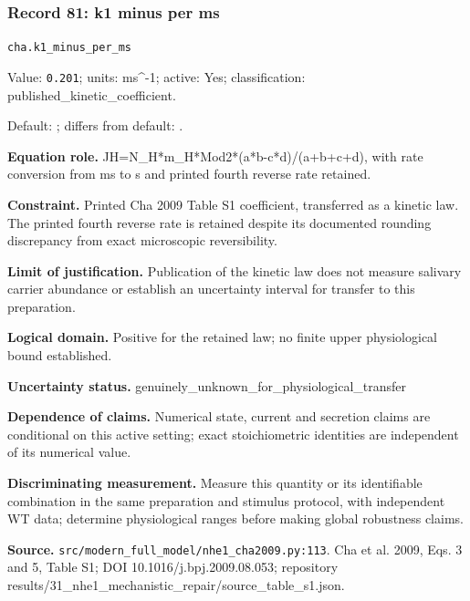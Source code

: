 \subsubsection*{Record 81: k1 minus per ms}
{\small \nolinkurl{cha.k1_minus_per_ms}\par

Value: \texttt{0.201}; units: ms\textasciicircum{}-1; active: Yes; classification: published\_kinetic\_coefficient.\par

Default: ; differs from default: .\par

\textbf{Equation role.} JH=N\_H*m\_H*Mod2*(a*b-c*d)/(a+b+c+d), with rate conversion from ms to s and printed fourth reverse rate retained.\par

\textbf{Constraint.} Printed Cha 2009 Table S1 coefficient, transferred as a kinetic law. The printed fourth reverse rate is retained despite its documented rounding discrepancy from exact microscopic reversibility.\par

\textbf{Limit of justification.} Publication of the kinetic law does not measure salivary carrier abundance or establish an uncertainty interval for transfer to this preparation.\par

\textbf{Logical domain.} Positive for the retained law; no finite upper physiological bound established.\par

\textbf{Uncertainty status.} genuinely\_unknown\_for\_physiological\_transfer\par

\textbf{Dependence of claims.} Numerical state, current and secretion claims are conditional on this active setting; exact stoichiometric identities are independent of its numerical value.\par

\textbf{Discriminating measurement.} Measure this quantity or its identifiable combination in the same preparation and stimulus protocol, with independent WT data; determine physiological ranges before making global robustness claims.\par

\textbf{Source.} \nolinkurl{src/modern_full_model/nhe1_cha2009.py:113}. Cha et al. 2009, Eqs. 3 and 5, Table S1; DOI 10.1016/j.bpj.2009.08.053; repository results/31\_nhe1\_mechanistic\_repair/source\_table\_s1.json.\par}

